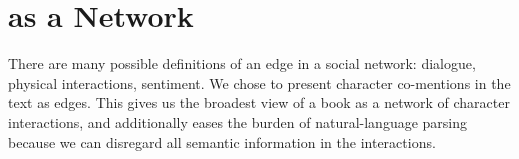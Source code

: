 \section{\infinitejest as a Network}

There are many possible definitions of an edge in a social network: dialogue, physical interactions, sentiment. 
We chose to present character co-mentions in the text as edges. 
This gives us the broadest view of a book as a network of character interactions, and additionally eases the burden of natural-language parsing because we can disregard all semantic information in the interactions.

